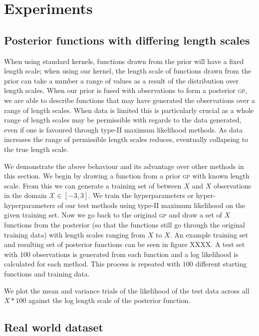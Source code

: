 \documentclass{article}
\begin{document}
\section{Experiments}



\subsection{Posterior functions with differing length scales}

When using standard kernels, functions drawn from the prior will have a fixed length scale; when using our kernel, the length scale of functions drawn from the prior can take a number a range of values as a result of the distribution over length scales. When our prior is fused with observations to form a posterior {\scshape gp}, we are able to describe functions that may have generated the observations over a range of length scales. When data is limited this is particularly crucial as a whole range of length scales may be permissible with regards to the data generated, even if one is favoured through type-II maximum likelihood methods. As data increases the range of permissible length scales reduces, eventually collapsing to the true length scale.

We demonstrate the above behaviour and its advantage over other methods in this section. We begin by drawing a function from a prior {\scshape gp} with known length scale. From this we can generate a training set of between $X$ and $X$ observations in the domain $\mathcal{X}\in [-3,3]$. We train the hyperparameters or hyper-hyperparameters of our test methods using type-II maximum likelihood on the given training set. Now we go back to the original {\scshape gp} and draw a set of $X$ functions from the posterior (so that the functions still go through the original training data) with length scales ranging from $X$ to $X$. An example training set and resulting set of posterior functions can be seen in figure XXXX. A test set with $100$ observations is generated from each function and a log likelihood is calculated for each method. This process is repeated with $100$ different starting functions and training data.

We plot the mean and variance trials of the likelihood of the test data across all $X*100$ against the log length scale of the posterior function.




\subsection{Real world dataset}
\end{document}

